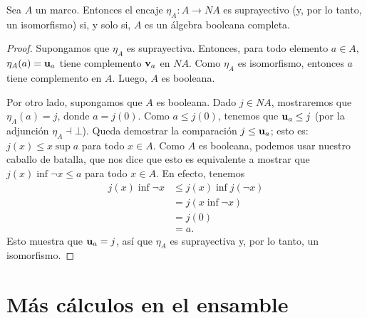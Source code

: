 \begin{thm}
  Sea $A$ un marco.
  Entonces el encaje $\eta_A:A\to NA$ es suprayectivo (y, por lo
  tanto, un isomorfismo) si, y solo
  si, $A$ es un álgebra booleana completa.
\end{thm}
\begin{proof}
    Supongamos que $\eta_A$ es suprayectiva.
    Entonces, para todo elemento $a\in A$,
    $\eta_A(a)=\mathbf u_{a}$ tiene complemento $\mathbf v_{a}$ en $NA$.
    Como $\eta_A$ es isomorfismo, entonces
    $a$ tiene complemento en $A$.
    Luego, $A$ es booleana.
    
    Por otro lado, supongamos que $A$ es booleana.
    Dado $j\in NA$, mostraremos que $\eta_A(a)=j$,
    donde $a=j(0)$.
    Como $a\leq j(0)$, tenemos que $\mathbf u_{a}\leq j$
    (por la adjunción $\eta_A\dashv\bot$).
    Queda demostrar la comparación $j\leq\mathbf u_{a}$;
    esto es: $j(x)\leq x\sup a$ para todo $x\in A$.
    Como $A$ es booleana, podemos usar nuestro
    caballo de batalla, que nos dice que esto es equivalente
    a mostrar que $j(x)\inf\neg x\leq a$ para todo $x\in A$.
    En efecto, tenemos
    \begin{align*}
        j(x)\inf\neg x
        &\leq j(x)\inf j(\neg x) \\
        &= j(x\inf\neg x) \\
        &= j(0) \\
        &= a.
    \end{align*}
    Esto muestra que $\mathbf u_{a}=j$,
    así que $\eta_A$ es suprayectiva y,
    por lo tanto, un isomorfismo.
\end{proof}

\section{Más cálculos en el ensamble}
\label{ssec:calculos}

